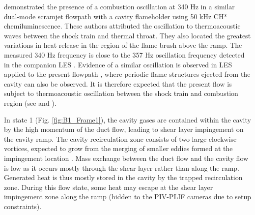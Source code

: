 \citet{AllisonFredericksonKirikEtAl2017} demonstrated the presence of a combustion oscillation at 340 Hz in a similar dual-mode scramjet flowpath with a cavity flameholder using 50 kHz CH* chemiluminescence. These authors attributed the oscillation to thermoacoustic waves between the shock train and thermal throat. They also located the greatest variations in heat release in the region of the flame brush above the ramp. The measured 340 Hz frequency is close to the 357 Hz oscillation frequency detected in the companion LES \citep{ramesh2015large}. Evidence of a similar oscillation is observed in LES applied to the present flowpath \citep{Nielsen2019}, where periodic flame structures ejected from the cavity can also be observed. It is therefore expected that the present flow is subject to thermoacoustic oscillation between the shock train and combustion region (see \citet{MatsuoMiyazatoKim1999} and \citet{WangWangSun2014}). 


In state 1 (Fig. \ref{fig:B1_Frame1}), the cavity gases are contained within the cavity by the high momentum of the duct flow, leading to shear layer impingement on the cavity ramp. The cavity recirculation zone consists of two large clockwise vortices, expected to grow from the merging of smaller eddies formed at the impingement location \citep{TuttleCarterHsu2014, Kirik2017}. Mass exchange between the duct flow and the cavity flow is low as it occurs mostly through the shear layer rather than along the ramp. Generated heat is thus mostly stored in the cavity by the trapped recirculation zone. During this flow state, some heat may escape at the shear layer impingement zone along the ramp (hidden to the PIV-PLIF cameras due to setup constraints). 


